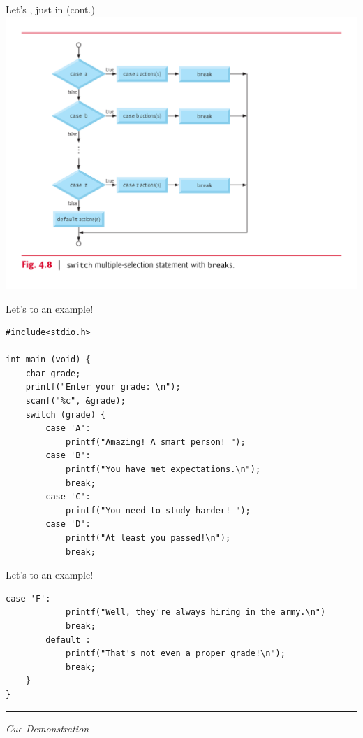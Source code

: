 \documentclass[11pt]{beamer}
\let\OldTexttt\texttt
\renewcommand{\texttt}[1]{\OldTexttt{\color{teal}{#1}}}
\begin{document}
\begin{frame}[fragile=singleslide]{Let's \texttt{switch}, just in \texttt{case} (cont.)}
\center
\includegraphics[scale=0.35]{switchflowchart.png}
\end{frame}

\begin{frame}[fragile=singleslide]{Let's \texttt{switch} to an example! }
\begin{lstlisting}[style=C]
#include<stdio.h>

int main (void) {
	char grade;
	printf("Enter your grade: \n");
	scanf("%c", &grade);
	switch (grade) {
		case 'A':
			printf("Amazing! A smart person! ");
		case 'B':
			printf("You have met expectations.\n");
			break;
		case 'C':
			printf("You need to study harder! ");
		case 'D':
			printf("At least you passed!\n");
			break;
\end{lstlisting}
\end{frame}

\begin{frame}[fragile=singleslide]{Let's \texttt{switch} to an example! }
\begin{lstlisting}[style=C]
		case 'F':
			printf("Well, they're always hiring in the army.\n")
			break;
		default :
			printf("That's not even a proper grade!\n");
			break;
	}
}
\end{lstlisting}
\hrule
\vspace{1em}
\emph{Cue Demonstration}
\end{frame}
\end{document}
